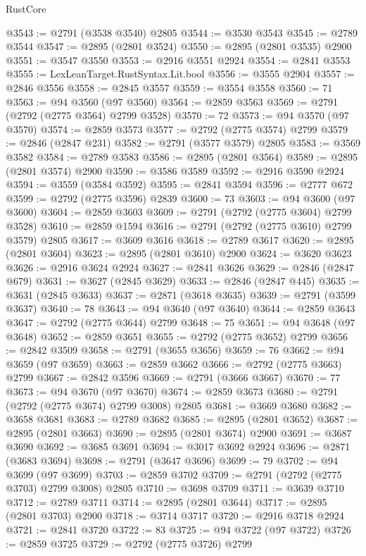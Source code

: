 \begin{lexlean}{RustCore}
\begin{coremodule}
@3543 := @2791 (@3538 @3540) @2805
@3544 := @3530 @3543
@3545 := @2789 @3544
@3547 := @2895 (@2801 @3524)
@3550 := @2895 (@2801 @3535) @2900
@3551 := @3547 @3550
@3553 := @2916 @3551 @2924
@3554 := @2841 @3553
@3555 := LexLeanTarget.RustSyntax.Lit.bool
@3556 := @3555 @2904
@3557 := @2846 @3556
@3558 := @2845 @3557
@3559 := @3554 @3558
@3560 := 71
@3563 := @94 @3560 (@97 @3560)
@3564 := @2859 @3563
@3569 := @2791 (@2792 (@2775 @3564) @2799 @3528)
@3570 := 72
@3573 := @94 @3570 (@97 @3570)
@3574 := @2859 @3573
@3577 := @2792 (@2775 @3574) @2799
@3579 := @2846 (@2847 @231)
@3582 := @2791 (@3577 @3579) @2805
@3583 := @3569 @3582
@3584 := @2789 @3583
@3586 := @2895 (@2801 @3564)
@3589 := @2895 (@2801 @3574) @2900
@3590 := @3586 @3589
@3592 := @2916 @3590 @2924
@3594 := @3559 (@3584 @3592)
@3595 := @2841 @3594
@3596 := @2777 @672
@3599 := @2792 (@2775 @3596) @2839
@3600 := 73
@3603 := @94 @3600 (@97 @3600)
@3604 := @2859 @3603
@3609 := @2791 (@2792 (@2775 @3604) @2799 @3528)
@3610 := @2859 @1594
@3616 := @2791 (@2792 (@2775 @3610) @2799 @3579) @2805
@3617 := @3609 @3616
@3618 := @2789 @3617
@3620 := @2895 (@2801 @3604)
@3623 := @2895 (@2801 @3610) @2900
@3624 := @3620 @3623
@3626 := @2916 @3624 @2924
@3627 := @2841 @3626
@3629 := @2846 (@2847 @679)
@3631 := @3627 (@2845 @3629)
@3633 := @2846 (@2847 @445)
@3635 := @3631 (@2845 @3633)
@3637 := @2871 (@3618 @3635)
@3639 := @2791 (@3599 @3637)
@3640 := 78
@3643 := @94 @3640 (@97 @3640)
@3644 := @2859 @3643
@3647 := @2792 (@2775 @3644) @2799
@3648 := 75
@3651 := @94 @3648 (@97 @3648)
@3652 := @2859 @3651
@3655 := @2792 (@2775 @3652) @2799
@3656 := @2842 @3509
@3658 := @2791 (@3655 @3656)
@3659 := 76
@3662 := @94 @3659 (@97 @3659)
@3663 := @2859 @3662
@3666 := @2792 (@2775 @3663) @2799
@3667 := @2842 @3596
@3669 := @2791 (@3666 @3667)
@3670 := 77
@3673 := @94 @3670 (@97 @3670)
@3674 := @2859 @3673
@3680 := @2791 (@2792 (@2775 @3674) @2799 @3008) @2805
@3681 := @3669 @3680
@3682 := @3658 @3681
@3683 := @2789 @3682
@3685 := @2895 (@2801 @3652)
@3687 := @2895 (@2801 @3663)
@3690 := @2895 (@2801 @3674) @2900
@3691 := @3687 @3690
@3692 := @3685 @3691
@3694 := @3017 @3692 @2924
@3696 := @2871 (@3683 @3694)
@3698 := @2791 (@3647 @3696)
@3699 := 79
@3702 := @94 @3699 (@97 @3699)
@3703 := @2859 @3702
@3709 := @2791 (@2792 (@2775 @3703) @2799 @3008) @2805
@3710 := @3698 @3709
@3711 := @3639 @3710
@3712 := @2789 @3711
@3714 := @2895 (@2801 @3644)
@3717 := @2895 (@2801 @3703) @2900
@3718 := @3714 @3717
@3720 := @2916 @3718 @2924
@3721 := @2841 @3720
@3722 := 83
@3725 := @94 @3722 (@97 @3722)
@3726 := @2859 @3725
@3729 := @2792 (@2775 @3726) @2799

\end{coremodule}
\end{lexlean}
